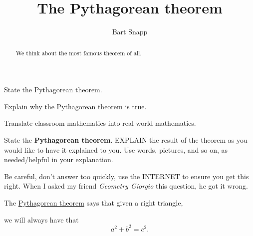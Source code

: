 \documentclass[noauthor,nooutcomes,handout,hints,12pt]{ximera}
\title{The Pythagorean theorem}
\author{Bart Snapp}
\begin{document}
\begin{abstract}
  We think about the most famous theorem of all.
\end{abstract}
\maketitle


\begin{listOutcomes}
\item{State the Pythagorean theorem.}
\item{Explain why the Pythagorean theorem is true.}
\item{Translate classroom mathematics into real world mathematics.}
\end{listOutcomes}
\mynewpage

\begin{question}
  State the \textbf{Pythagorean theorem}. EXPLAIN the result of the theorem as
  you would like to have it explained to you.  Use words, pictures,
  and so on, as needed/helpful in your explanation.
  \begin{hint}
    Be careful, don't answer too quickly, use the INTERNET to ensure
    you get this right. When I asked my friend \textit{Geometry Giorgio} this
    question, he got it wrong.
  \end{hint}
  \begin{freeResponse}
    The \underline{Pythagorean theorem} says that given a right
    triangle,
    \begin{center}
    \end{center}
    we will always have that
    \[
    a^2 + b^2 = c^2.
    \]
  \end{freeResponse}
\end{question}
\mynewpage
\end{document}
